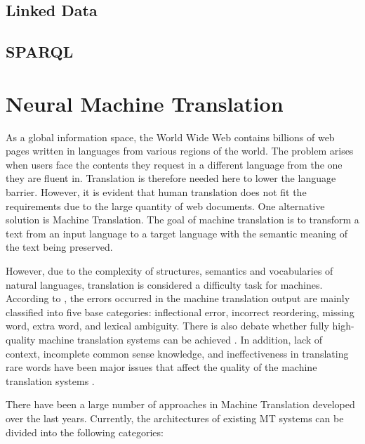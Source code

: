 \subsection{Linked Data} \label{subsection:linked data}


\subsection{SPARQL} \label{subsection:sparql}


\section{Neural Machine Translation} \label{section:neural machine translation}
As a global information space, the World Wide Web contains billions of web pages written in languages from various regions of the world. The problem arises when users face the contents they request in a different language from the one they are fluent in. Translation is therefore needed here to lower the language barrier. However, it is evident that human translation does not fit the requirements due to the large quantity of web documents. One alternative solution is Machine Translation. The goal of machine translation is to transform a text from an input language to a target language with the semantic meaning of the text being preserved.

However, due to the complexity of structures, semantics and vocabularies of natural languages, translation is considered a difficulty task for machines. According to \cite{Popovic2012}, the errors occurred in the machine translation output are mainly classified into five base categories: inflectional error, incorrect reordering, missing word, extra word, and lexical ambiguity. There is also debate whether fully high-quality machine translation systems can be achieved \cite{bar1964language}. In addition, lack of context, incomplete common sense knowledge, and ineffectiveness in translating rare words have been major issues that affect the quality of the machine translation systems \cite{okpor2014machine} \cite{Wu2016}.

There have been a large number of approaches in Machine Translation developed over the last years. Currently, the architectures of existing MT systems can be divided into the following categories: 

